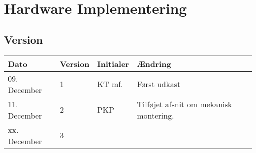 \chapter{Hardware Implementering}\label{ch:hwimpl}
\section*{Version}
\begin{table}[h]
	\centering
	\begin{tabularx}{\textwidth - 2cm}{|l|l|l|X|}
	\hline
	Dato			& Version			& Initialer 		& Ændring										\\ \hline
	09. December	& 1 				& KT mf.	 		& Først udkast			\\ \hline
	11. December	& 2 				& PKP		 		& Tilføjet afsnit om mekanisk montering.	\\\hline
	xx. December	& 3 				& 			 		& 						\\ \hline
	\end{tabularx}
\end{table}
\clearpage

\clearpage
\clearpage
\clearpage
\clearpage